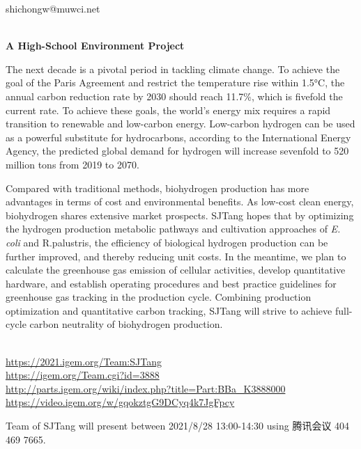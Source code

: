   shichongw@muwci.net


\textbf{\\A High-School Environment Project\\}\begin{spacing}{1.5}

The next decade is a pivotal period in tackling climate change. To achieve the goal of the Paris Agreement and restrict the temperature rise within 1.5°C, the annual carbon reduction rate by 2030 should reach 11.7\%, which is fivefold the current rate. To achieve these goals, the world’s energy mix requires a rapid transition to renewable and low-carbon energy. Low-carbon hydrogen can be used as a powerful substitute for hydrocarbons, according to the International Energy Agency, the predicted global demand for hydrogen will increase sevenfold to 520 million tons from 2019 to 2070.

Compared with traditional methods, biohydrogen production has more advantages in terms of cost and environmental benefits. As low-cost clean energy, biohydrogen shares extensive market prospects. SJTang hopes that by optimizing the hydrogen production metabolic pathways and cultivation approaches of \textit{E. coli} and R.palustris, the efficiency of biological hydrogen production can be further improved, and thereby reducing unit costs. In the meantime, we plan to calculate the greenhouse gas emission of cellular activities, develop quantitative hardware, and establish operating procedures and best practice guidelines for greenhouse gas tracking in the production cycle. Combining production optimization and quantitative carbon tracking, SJTang will strive to achieve full-cycle carbon neutrality of biohydrogen production.\end{spacing}
\\

\url{https://2021.igem.org/Team:SJTang }\\
\url{https://igem.org/Team.cgi?id=3888 }\\
\url{http://parts.igem.org/wiki/index.php?title=Part:BBa_K3888000 }\\
\url{https://video.igem.org/w/gqokztgG9DCyq4k7JgFpcy }\\

\vfill{}









Team of SJTang will present between      2021/8/28 13:00-14:30   using 腾讯会议 404 469 7665.
\newpage


